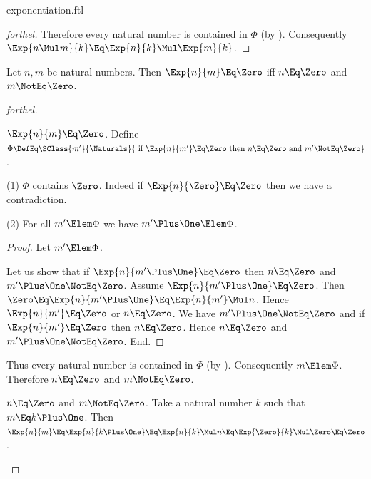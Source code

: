 \documentclass{stex}
\begin{document}
\begin{smodule}{exponentiation.ftl}
\begin{proof}[forthel]
  Therefore every natural number is contained in $\Phi$ (by ).
  Consequently $\Exp{n \Mul m}{k} \Eq \Exp{n}{k} \Mul \Exp{m}{k}$.
\end{proof}

\begin{proposition*}[forthel]
  Let $n, m$ be natural numbers.
  Then $\Exp{n}{m} \Eq \Zero$ iff $n \Eq \Zero$ and $m \NotEq \Zero$.
\end{proposition*}
\begin{proof}[forthel]
  \begin{case}{$\Exp{n}{m} \Eq \Zero$.}
    Define $\Phi \DefEq \SClass{m'}{\Naturals}{\text{ if }\Exp{n}{m'} \Eq \Zero\text{ then }n \Eq \Zero\text{ and }m' \NotEq \Zero}$.

    (1) $\Phi$ contains $\Zero$.
    Indeed if $\Exp{n}{\Zero} \Eq \Zero$ then we have a contradiction.

    (2) For all $m' \Elem \Phi$ we have $m' \Plus \One \Elem \Phi$.
    \begin{proof}
      Let $m' \Elem \Phi$.

      Let us show that if $\Exp{n}{m' \Plus \One} \Eq \Zero$ then $n \Eq \Zero$ and $m' \Plus \One \NotEq \Zero$.
        Assume $\Exp{n}{m' \Plus \One} \Eq \Zero$.
        Then $\Zero \Eq \Exp{n}{m' \Plus \One} \Eq \Exp{n}{m'} \Mul n$.
        Hence $\Exp{n}{m'} \Eq \Zero$ or $n \Eq \Zero$.
        We have $m' \Plus \One \NotEq \Zero$ and if $\Exp{n}{m'} \Eq \Zero$ then $n \Eq \Zero$.
        Hence $n \Eq \Zero$ and $m' \Plus \One \NotEq \Zero$.
      End.
    \end{proof}

    Thus every natural number is contained in $\Phi$ (by ).
    Consequently $m \Elem \Phi$.
    Therefore $n \Eq \Zero$ and $m \NotEq \Zero$.
  \end{case}

  \begin{case}{$n \Eq \Zero$ and $m \NotEq \Zero$.}
    Take a natural number $k$ such that $m \Eq k \Plus \One$.
    Then $\Exp{n}{m}
      \Eq \Exp{n}{k \Plus \One}
      \Eq \Exp{n}{k} \Mul n
      \Eq \Exp{\Zero}{k} \Mul \Zero
      \Eq \Zero$.
  \end{case}
\end{proof}

\end{smodule}
\end{document}
